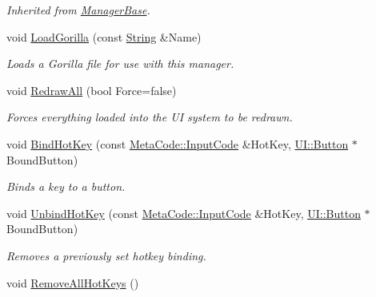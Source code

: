 \begin{DoxyCompactItemize}
\begin{DoxyCompactList}\small\item\em Inherited from \hyperlink{classphys_1_1ManagerBase}{ManagerBase}. \item\end{DoxyCompactList}\item 
void \hyperlink{classphys_1_1UIManager_afda4422105d6ab353fd40410adffbc0a}{LoadGorilla} (const \hyperlink{namespacephys_aa03900411993de7fbfec4789bc1d392e}{String} \&Name)
\begin{DoxyCompactList}\small\item\em Loads a Gorilla file for use with this manager. \item\end{DoxyCompactList}\item 
void \hyperlink{classphys_1_1UIManager_a4a4ce18dc4f32f8274a50fb4b99b87e3}{RedrawAll} (bool Force=false)
\begin{DoxyCompactList}\small\item\em Forces everything loaded into the UI system to be redrawn. \item\end{DoxyCompactList}\item 
void \hyperlink{classphys_1_1UIManager_a935d79d7b2ba71075c330e6bc0c7391c}{BindHotKey} (const \hyperlink{classphys_1_1MetaCode_a3e501cbb5bf0f6f1fdb7211465bda8d8}{MetaCode::InputCode} \&HotKey, \hyperlink{classphys_1_1UI_1_1Button}{UI::Button} $\ast$BoundButton)
\begin{DoxyCompactList}\small\item\em Binds a key to a button. \item\end{DoxyCompactList}\item 
void \hyperlink{classphys_1_1UIManager_a9d79615c0c9f9895dd10ac0399aa6e81}{UnbindHotKey} (const \hyperlink{classphys_1_1MetaCode_a3e501cbb5bf0f6f1fdb7211465bda8d8}{MetaCode::InputCode} \&HotKey, \hyperlink{classphys_1_1UI_1_1Button}{UI::Button} $\ast$BoundButton)
\begin{DoxyCompactList}\small\item\em Removes a previously set hotkey binding. \item\end{DoxyCompactList}\item 
\hypertarget{classphys_1_1UIManager_ac09c26ff3d5bade09f0480d5702d2042}{
void \hyperlink{classphys_1_1UIManager_ac09c26ff3d5bade09f0480d5702d2042}{RemoveAllHotKeys} ()}
\label{classphys_1_1UIManager_ac09c26ff3d5bade09f0480d5702d2042}


\end{DoxyCompactItemize}
